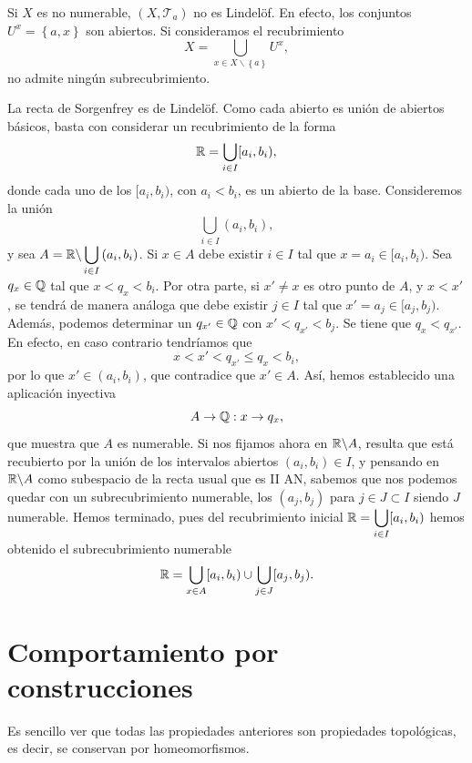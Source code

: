 \begin{eg}
	Si $\displaystyle X $ es no numerable, $\displaystyle \left(X, \mathcal{T}_{a}\right) $ no es Lindelöf. En efecto, los conjuntos $\displaystyle U^{x}= \left\{ a,x\right\}  $ son abiertos. Si consideramos el recubrimiento 
	\[X = \bigcup_{x \in X \backslash \left\{ a\right\} }U^{x} ,\]
	no admite ningún subrecubrimiento.
\end{eg}
\begin{eg}
La recta de Sorgenfrey es de Lindelöf. Como cada abierto es unión de abiertos básicos, basta con considerar un recubrimiento de la forma
\[ \mathbb{R} = \bigcup_{i \in I}[a_{i}, b_{i}) ,\]
 donde cada uno de los $\displaystyle [a_{i}, b_{i}) $, con $\displaystyle a_{i} < b_{i} $, es un abierto de la base. Consideremos la unión 
 \[\bigcup_{i \in I}\left(a_{i}, b_{i}\right) ,\]
 y sea $\displaystyle A = \mathbb{R} \backslash \bigcup_{i \in I}\left(a_{i}, b_{i}\right) $. 
 Si $\displaystyle x \in A $ debe existir $\displaystyle i \in I $ tal que $\displaystyle x = a_{i}\in [a_{i}, b_{i}) $. Sea $\displaystyle q_{x}\in \mathbb{Q} $ tal que $\displaystyle x < q_{x} < b_{i} $. Por otra parte, si $\displaystyle x' \neq x $ es otro punto de $\displaystyle A $, y $\displaystyle x < x' $, se tendrá de manera análoga que debe existir $\displaystyle j \in I $ tal que $\displaystyle x' = a_{j}\in [a_{j}, b_{j}) $. Además, podemos determinar un $\displaystyle q_{x'}\in \mathbb{Q} $ con $\displaystyle x' < q_{x'} < b_{j} $. 
 Se tiene que $\displaystyle q_{x} < q_{x'} $. En efecto, en caso contrario tendríamos que 
 \[x < x' < q_{x'} \leq q_{x} < b_{i} ,\]
 por lo que $\displaystyle x' \in \left(a_{i}, b_{i}\right) $, que contradice que $\displaystyle x ' \in A $. Así, hemos establecido una aplicación inyectiva
 \[A \to \mathbb{Q} : x \to q_{x} ,\]
 que muestra que $\displaystyle A $ es numerable. Si nos fijamos ahora en $\displaystyle \mathbb{R}\backslash A $, resulta que está recubierto por la unión de los intervalos abiertos $\displaystyle \left(a_{i}, b_{i}\right)\in I $, y pensando en $\displaystyle \mathbb{R} \backslash A $ como subespacio de la recta usual que es II AN, sabemos que nos podemos quedar con un subrecubrimiento numerable, los $\displaystyle \left( a_{j}, b_{j}\right)  $ para $\displaystyle j \in J \subset I $ siendo $\displaystyle J $ numerable. 
 Hemos terminado, pues del recubrimiento inicial $\displaystyle \mathbb{R} = \bigcup_{i \in I}[a_{i}, b_{i}) $ hemos obtenido el subrecubrimiento numerable
 \[\mathbb{R} = \bigcup_{x \in A}[a_{i}, b_{i}) \cup \bigcup_{j \in J}[a_{j}, b_{j}) .\]
\end{eg}
\section{Comportamiento por construcciones}
\begin{observation}
Es sencillo ver que todas las propiedades anteriores son propiedades topológicas, es decir, se conservan por homeomorfismos. 
\end{observation}
